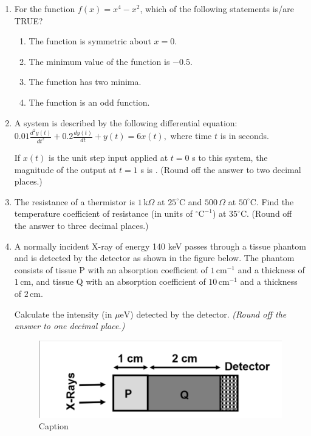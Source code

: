 \documentclass[journal]{IEEEtran}
\begin{document}
\begin{enumerate}
\item 
For the function \( f(x) = x^4 - x^2 \), which of the following statements is/are TRUE?

\begin{enumerate}[label=(\Alph*)]
    \item The function is symmetric about \( x = 0 \).
    \item The minimum value of the function is \( -0.5 \).
    \item The function has two minima.
    \item The function is an odd function.
\end{enumerate}
\hfill{}

\item 
A system is described by the following differential equation:
$
0.01 \frac{d^2 y(t)}{dt^2} + 0.2 \frac{dy(t)}{dt} + y(t) = 6x(t),
$
where time \( t \) is in seconds.

If \( x(t) \) is the unit step input applied at \( t = 0 \) s to this system, the magnitude of the output at \( t = 1 \) s is \underline{\hspace{3cm}}. 
(Round off the answer to two decimal places.)
\hfill{}

\item  
The resistance of a thermistor is $1 \, \text{k}\Omega$ at $25^{\circ}\text{C}$ and $500 \, \Omega$ at $50^{\circ}\text{C}$. Find the temperature coefficient of resistance (in units of $^{\circ}\text{C}^{-1}$) at $35^{\circ}\text{C}$. (Round off the answer to three decimal places.)
\hfill{}

\item 
A normally incident X-ray of energy 140 keV passes through a tissue phantom and is detected by the detector as shown in the figure below. The phantom consists of tissue P with an absorption coefficient of \( 1\, \text{cm}^{-1} \) and a thickness of \( 1\, \text{cm} \), and tissue Q with an absorption coefficient of \( 10\, \text{cm}^{-1} \) and a thickness of \( 2\, \text{cm} \).

Calculate the intensity (in \(\mu\text{eV}\)) detected by the detector. 
\textit{(Round off the answer to one decimal place.)}

\begin{figure}
    \centering
    \includegraphics[width=0.5\columnwidth]{Figs/q56.png}
    \caption{Caption}
    \label{fig:placeholder}
\end{figure}



\end{enumerate}
\end{document}
